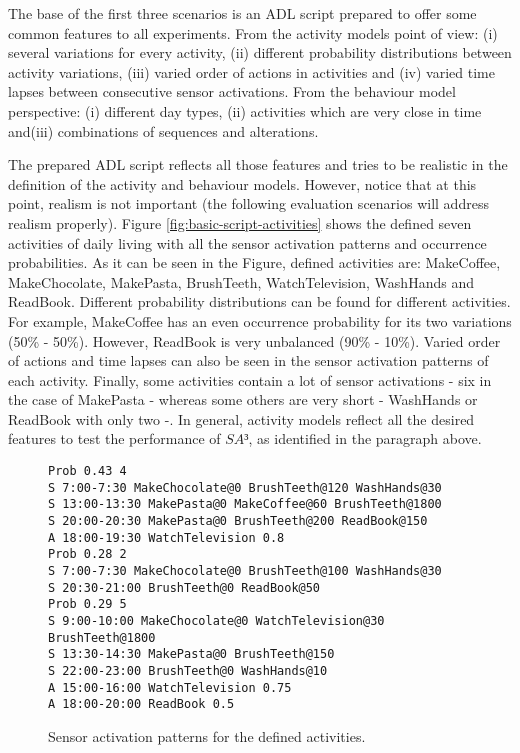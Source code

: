 The base of the first three scenarios is an ADL script prepared to offer some common features to all experiments. From the activity models point of view: (i) several variations for every activity, (ii) different probability distributions between activity variations, (iii) varied order of actions in activities and (iv) varied time lapses between consecutive sensor activations. From the behaviour model perspective: (i) different day types, (ii) activities which are very close in time and(iii) combinations of sequences and alterations.

The prepared ADL script reflects all those features and tries to be realistic in the definition of the activity and behaviour models. However, notice that at this point, realism is not important (the following evaluation scenarios will address realism properly). Figure \ref{fig:basic-script-activities} shows the defined seven activities of daily living with all the sensor activation patterns and occurrence probabilities. As it can be seen in the Figure, defined activities are: MakeCoffee, MakeChocolate, MakePasta, BrushTeeth, WatchTelevision, WashHands and ReadBook. Different probability distributions can be found for different activities. For example, MakeCoffee has an even occurrence probability for its two variations (50\% - 50\%). However, ReadBook is very unbalanced (90\% - 10\%). Varied order of actions and time lapses can also be seen in the sensor activation patterns of each activity. Finally, some activities contain a lot of sensor activations - six in the case of MakePasta - whereas some others are very short - WashHands or ReadBook with only two -. In general, activity models reflect all the desired features to test the performance of $SA³$, as identified in the paragraph above.

\begin{figure}
\begin{small}
\lstset{linewidth=\textwidth}
\begin{lstlisting}
Prob 0.43 4
S 7:00-7:30 MakeChocolate@0 BrushTeeth@120 WashHands@30
S 13:00-13:30 MakePasta@0 MakeCoffee@60 BrushTeeth@1800
S 20:00-20:30 MakePasta@0 BrushTeeth@200 ReadBook@150
A 18:00-19:30 WatchTelevision 0.8
Prob 0.28 2
S 7:00-7:30 MakeChocolate@0 BrushTeeth@100 WashHands@30
S 20:30-21:00 BrushTeeth@0 ReadBook@50
Prob 0.29 5
S 9:00-10:00 MakeChocolate@0 WatchTelevision@30 BrushTeeth@1800
S 13:30-14:30 MakePasta@0 BrushTeeth@150
S 22:00-23:00 BrushTeeth@0 WashHands@10
A 15:00-16:00 WatchTelevision 0.75
A 18:00-20:00 ReadBook 0.5
\end{lstlisting}
\end{small}
\caption{Sensor activation patterns for the defined activities.}
\label{fig:basic-script-behaviour}
\end{figure}


